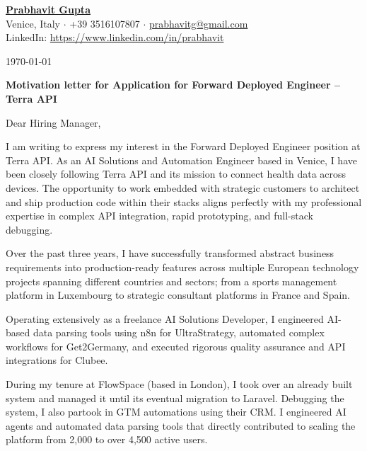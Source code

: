 \documentclass[11pt, a4paper]{article}
\begin{document}
\noindent
\underline{\textbf{Prabhavit Gupta}} \\
Venice, Italy $\cdot$ +39 3516107807 $\cdot$ \href{mailto:prabhavitg@gmail.com}{prabhavitg@gmail.com} \\
LinkedIn: \href{https://www.linkedin.com/in/prabhavit}{https://www.linkedin.com/in/prabhavit}

\vspace{0.5cm}
\noindent \today

\vspace{0.5cm}
\noindent \textbf{Motivation letter for Application for Forward Deployed Engineer – Terra API}

\vspace{0.5cm}
\noindent Dear Hiring Manager,

\vspace{0.3cm}
\noindent I am writing to express my interest in the Forward Deployed Engineer position at Terra API. As an AI Solutions and Automation Engineer based in Venice, I have been closely following Terra API and its mission to connect health data across devices. The opportunity to work embedded with strategic customers to architect and ship production code within their stacks aligns perfectly with my professional expertise in complex API integration, rapid prototyping, and full-stack debugging.

\vspace{0.3cm}
\noindent Over the past three years, I have successfully transformed abstract business requirements into production-ready features across multiple European technology projects spanning different countries and sectors; from a sports management platform in Luxembourg to strategic consultant platforms in France and Spain.

\vspace{0.3cm}
\noindent Operating extensively as a freelance AI Solutions Developer, I engineered AI-based data parsing tools using n8n for UltraStrategy, automated complex workflows for Get2Germany, and executed rigorous quality assurance and API integrations for Clubee.

\vspace{0.3cm}
\noindent During my tenure at FlowSpace (based in London), I took over an already built system and managed it until its eventual migration to Laravel. Debugging the system, I also partook in GTM automations using their CRM. I engineered AI agents and automated data parsing tools that directly contributed to scaling the platform from 2,000 to over 4,500 active users.
\end{document}
